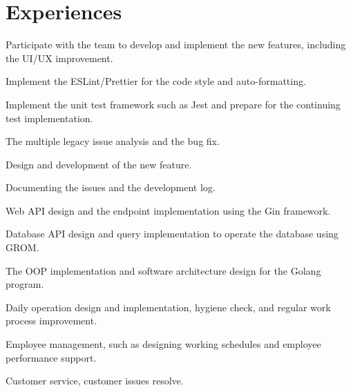 \section{Experiences}

\begin{resume_list}
\vspace{0.5em}
\item Participate with the team to develop and implement the new features, including the UI/UX improvement.
\item Implement the ESLint/Prettier for the code style and auto-formatting.
\item Implement the unit test framework such as Jest and prepare for the continuing test implementation.
\vspace{0.5em}
\item The multiple legacy issue analysis and the bug fix.
\item  Design and development of the new feature.
\item  Documenting the issues and the development log.
\vspace{0.5em}
\item Web API design and the endpoint implementation using the Gin framework.
\item Database API design and query implementation to operate the database using GROM. 
\item The OOP implementation and software architecture design for the Golang program.
\end{resume_list}

\vspace{1.5em}
\begin{resume_list}
\item Daily operation design and implementation, hygiene check, and regular work process improvement.
\item Employee management, such as designing working schedules and employee performance support.
\item Customer service, customer issues resolve.
\end{resume_list}

